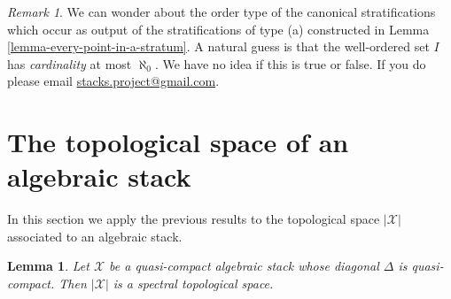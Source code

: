 \documentclass{stacks-project}
\theoremstyle{plain}
\newtheorem{lemma}[subsection]{Lemma}
\theoremstyle{definition}
\theoremstyle{remark}
\newtheorem{remark}[subsection]{Remark}
\numberwithin{equation}{subsection}
\begin{document}
\begin{remark}
\label{remark-order-type}
We can wonder about the order type of the canonical stratifications which
occur as output of the stratifications of type (a) constructed in
Lemma \ref{lemma-every-point-in-a-stratum}.
A natural guess is that the well-ordered set $I$ has
{\it cardinality} at most $\aleph_0$. We have no idea if this is true
or false. If you do please email
\href{mailto:stacks.project@gmail.com}{stacks.project@gmail.com}.
\end{remark}







\section{The topological space of an algebraic stack}
\label{section-topology}

\noindent
In this section we apply the previous results to the topological
space $|\mathcal{X}|$ associated to an algebraic stack.

\begin{lemma}
\label{lemma-spectral-qc-diagonal-qc}
Let $\mathcal{X}$ be a quasi-compact algebraic stack
whose diagonal $\Delta$ is quasi-compact.
Then $|\mathcal{X}|$ is a spectral topological space.
\end{lemma}
\end{document}

